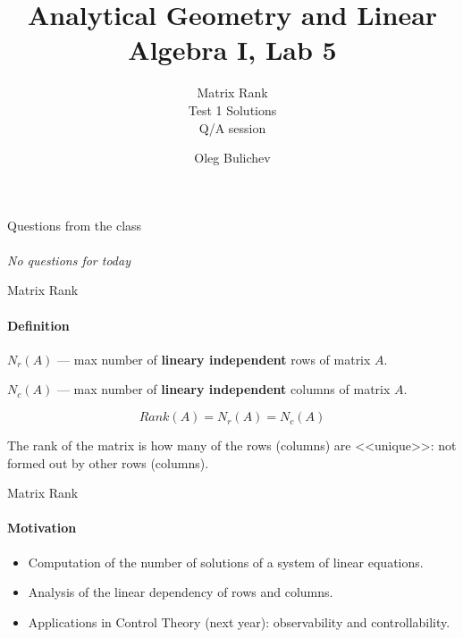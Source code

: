 \documentclass[aspectratio=169]{beamer}
\title[AGLA1]{Analytical Geometry and Linear Algebra I, Lab 5} %
\subtitle{Matrix Rank \\ Test 1 Solutions \\ Q/A session   
         } %
\author{Oleg Bulichev}
\newcommand{\fbckg}[1]{\usebackgroundtemplate{\texttt{[image: \#1]}}}%
\begin{document}
\setlength{\abovedisplayskip}{0pt}
\setlength{\belowdisplayskip}{0pt}
\setlength{\abovedisplayshortskip}{0pt}
\setlength{\belowdisplayshortskip}{0pt}

\fbckg{fibeamer/figs/title_page.png}

\fbckg{fibeamer/figs/common.png}


\begin{frame}[c]{Questions from the class}
\framesubtitle{}
\centering
    \textit{ \Large No questions for today}
\end{frame}

\begin{frame}[t]{Matrix Rank}
    \framesubtitle{Definition}
        \textbf{$N_r(A)$} --- max number of \textbf{lineary independent} rows of matrix $A$.
    
        \textbf{$N_c(A)$} --- max number of \textbf{lineary independent} columns of matrix $A$.
    
        \begin{equation*}
            Rank(A) = N_r(A) = N_c(A)
        \end{equation*}
    \bigskip
    
        \centering
        The rank of the matrix is how many of the rows (columns) are <<unique>>: not formed out by other rows (columns).
    \end{frame}
    
    \begin{frame}[t]{Matrix Rank}
    \framesubtitle{Motivation}
        \begin{itemize}
            \item Computation of the number of solutions of a system of linear equations.
            \item Analysis of the linear dependency of rows and columns.
            \item Applications in Control Theory (next year): observability and controllability.
        \end{itemize}
    \end{frame}
    
\end{document}
